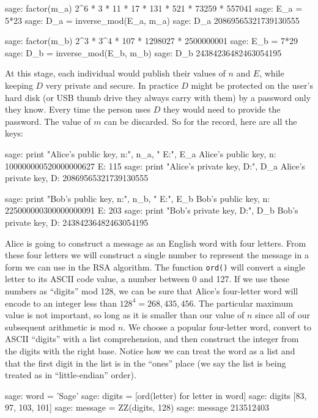 %
\begin{sageexample}
sage: factor(m_a)
2^6 * 3 * 11 * 17 * 131 * 521 * 73259 * 557041
sage: E_a = 5*23
sage: D_a = inverse_mod(E_a, m_a)
sage: D_a
20869565321739130555
\end{sageexample}
%
\begin{sageexample}
sage: factor(m_b)
2^3 * 3^4 * 107 * 1298027 * 2500000001
sage: E_b = 7*29
sage: D_b = inverse_mod(E_b, m_b)
sage: D_b
24384236482463054195
\end{sageexample}
%
At this stage, each individual would publish their values of $n$ and $E$, while keeping $D$ very private and secure.  In practice $D$ might be protected on the user's hard disk (or USB thumb drive they always carry with them) by a password only they know.  Every time the person uses $D$ they would need to provide the password.  The value of $m$ can be discarded.  So for the record, here are all the keys:
%
\begin{sageexample}
sage: print "Alice's public key, n:", n_a, " E:", E_a
Alice's public key, n: 100000000520000000627  E: 115
sage: print "Alice's private key, D:", D_a
Alice's private key, D: 20869565321739130555
\end{sageexample}
%
\begin{sageexample}
sage: print "Bob's public key, n:", n_b, " E:", E_b
Bob's public key, n: 225000000300000000091  E: 203
sage: print "Bob's private key, D:", D_b
Bob's private key, D: 24384236482463054195
\end{sageexample}
%
%
Alice is going to construct a message as an English word with four letters.  From these four letters we will construct a single number to represent the message in a form we can use in the RSA algorithm.  The function \verb?ord()? will convert a single letter to its ASCII code value, a number between 0 and 127.  If we use these numbers as ``digits'' mod 128, we can be sure that Alice's four-letter word will encode to an integer less than $128^4=268,435,456$.  The particular maximum value is not important, so long as it is smaller than our value of $n$ since all of our subsequent arithmetic is mod $n$.  We choose a popular four-letter word, convert to ASCII ``digits'' with a list comprehension, and then construct the integer from the digits with the right base.  Notice how we can treat the word as a list and that the first digit in the list is in the ``ones'' place (we say the list is being treated as in ``little-endian'' order).
%
\begin{sageexample}
sage: word = 'Sage'
sage: digits = [ord(letter) for letter in word]
sage: digits
[83, 97, 103, 101]
sage: message = ZZ(digits, 128)
sage: message
213512403
\end{sageexample}
